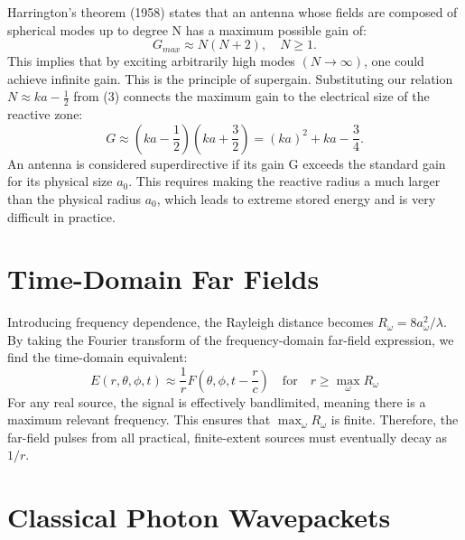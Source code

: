 \documentclass[11pt,a4paper]{article}
\begin{document}
Harrington's theorem (1958) states that an antenna whose fields are composed of spherical modes up to degree N has a maximum possible gain of:
\begin{equation}
    G_{max} \approx N(N+2), \quad N\ge1.
\end{equation}
This implies that by exciting arbitrarily high modes \((N\rightarrow\infty)\), one could achieve infinite gain. This is the principle of supergain. Substituting our relation \(N\approx ka-\frac{1}{2}\) from (3) connects the maximum gain to the electrical size of the reactive zone:
\begin{equation}
    G\approx\left(ka-\frac{1}{2}\right)\left(ka+\frac{3}{2}\right)=(ka)^{2}+ka-\frac{3}{4}.
\end{equation}
An antenna is considered superdirective if its gain G exceeds the standard gain for its physical size \(a_{0}\). This requires making the reactive radius a much larger than the physical radius \(a_{0}\), which leads to extreme stored energy and is very difficult in practice.

\section{Time-Domain Far Fields}

Introducing frequency dependence, the Rayleigh distance becomes \(R_{\omega}=8a_{\omega}^{2}/\lambda\). By taking the Fourier transform of the frequency-domain far-field expression, we find the time-domain equivalent:
\begin{equation}
    E(r,\theta,\phi,t)\approx\frac{1}{r}F\left(\theta,\phi,t-\frac{r}{c}\right) \quad \text{for} \quad r\ge \max_{\omega}R_{\omega}
\end{equation}
For any real source, the signal is effectively bandlimited, meaning there is a maximum relevant frequency. This ensures that \(\max_{\omega}R_{\omega}\) is finite. Therefore, the far-field pulses from all practical, finite-extent sources must eventually decay as \(1/r\).

\section{Classical Photon Wavepackets}
\end{document}
